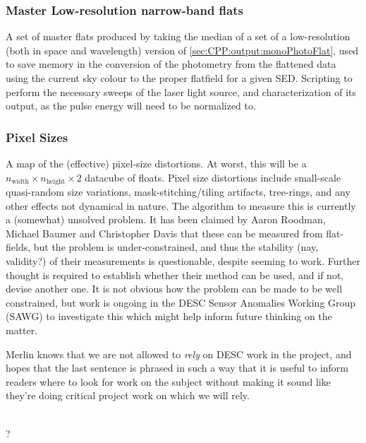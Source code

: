 \subsubsection{Master Low-resolution narrow-band flats}\label{sec:CPP:output:monoPhotoFlatLowRes}
A set of master flats produced by taking the median of a set of a low-resolution (both in space and wavelength) version of \secsymbol\ref{sec:CPP:output:monoPhotoFlat}, used to save memory in the conversion of the photometry from the flattened data using the current sky colour to the proper flatfield for a given SED.
\alg Scripting to perform the necessary sweeps of the laser light source, and characterization of its output, as the pulse energy will need to be normalized to.	


\subsubsection{Pixel Sizes}\label{sec:CPP:output:pixelSizeMap} 
A map of the (effective) pixel-size distortions. At worst, this will be a {$n_{\mbox{width}}\times n_{\mbox{height}}\times 2$} datacube of floats. Pixel size distortions include small-scale quasi-random size variations, mask-stitching/tiling artifacts, tree-rings, and any other effects not dynamical in nature.
\alg The algorithm to measure this is currently a (somewhat) unsolved problem. It has been claimed by Aaron Roodman, Michael Baumer and Christopher Davis that these can be measured from flat-fields, but the problem is under-constrained, and thus the stability (nay, validity?) of their measurements is questionable, despite seeming to work. Further thought is required to establish whether their method can be used, and if not, devise another one. It is not obvious how the problem can be made to be well constrained, but work is ongoing in the DESC Sensor Anomalies Working Group (SAWG) to investigate this which might help inform future thinking on the matter.
\begin{note}
	Merlin knows that we are not allowed to \emph{rely} on DESC work in the project, and hopes that the last sentence is phrased in such a way that it is useful to inform readers where to look for work on the subject without making it sound like they're doing critical project work on which we will rely.
\end{note}
\\ \dragons ?


